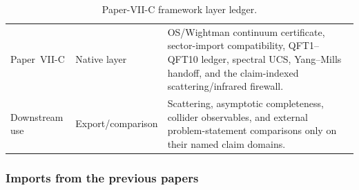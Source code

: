 \documentclass[12pt,a4paper]{article}
\begin{document}
\begin{table}[!htbp]
\begin{tabularx}{\textwidth}{@{}p{}p{}X@{}}
Paper~VII-C & Native layer & OS/Wightman continuum certificate, sector-import compatibility, QFT1--QFT10 ledger, spectral UCS, Yang--Mills handoff, and the claim-indexed scattering/infrared firewall. \\
Downstream use & Export/comparison & Scattering, asymptotic completeness, collider observables, and external problem-statement comparisons only on their named claim domains. \\
\bottomrule
\end{tabularx}
\caption[Paper-VII-C framework layer ledger]{Paper-VII-C framework layer ledger.}
\label{p12:tab:framework-layer-ledger}
\end{table}


\subsubsection{Imports from the previous papers}
\label{p12:sec:imports}
\end{document}
